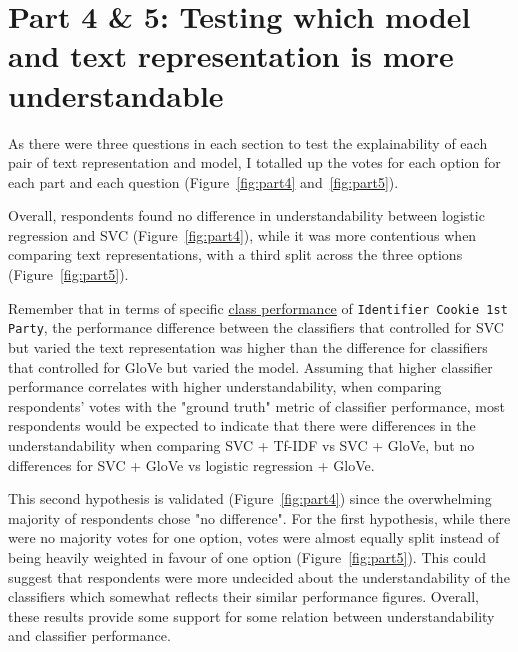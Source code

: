 \section{Part 4 \& 5: Testing which model and text representation is more understandable}
As there were three questions in each section to test the explainability of each pair of text representation and model, I totalled up the votes for each option for each part and each question (Figure~\ref{fig:part4} and~\ref{fig:part5}).

Overall, respondents found no difference in understandability between logistic regression and SVC (Figure~\ref{fig:part4}), while it was more contentious when comparing text representations, with a third split across the three options (Figure~\ref{fig:part5}). 

Remember that in terms of specific \hyperref[fig:heatmaps_perf]{class performance} of \texttt{Identifier Cookie 1st Party}, the performance difference between the classifiers that controlled for SVC but varied the text representation was higher than the difference for classifiers that controlled for GloVe but varied the model. Assuming that higher classifier performance correlates with higher understandability, when comparing respondents' votes with the "ground truth" metric of classifier performance, most respondents would be expected to indicate that there were differences in the understandability when comparing SVC + Tf-IDF vs SVC + GloVe, but no differences for SVC + GloVe vs logistic regression + GloVe. 

This second hypothesis is validated (Figure~\ref{fig:part4}) since the overwhelming majority of respondents chose "no difference". For the first hypothesis, while there were no majority votes for one option, votes were almost equally split instead of being heavily weighted in favour of one option (Figure~\ref{fig:part5}). This could suggest that respondents were more undecided about the understandability of the classifiers which somewhat reflects their similar performance figures. Overall, these results provide some support for some relation between understandability and classifier performance.

